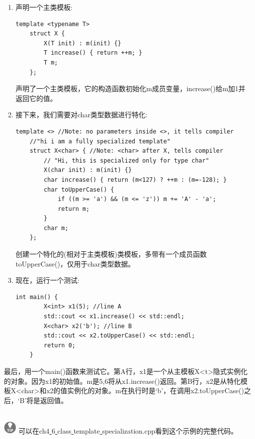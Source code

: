 \begin{enumerate}
	\item 声明一个主类模板: \par
	\begin{lstlisting}[caption={}]
	template <typename T>
	struct X {
		X(T init) : m(init) {}
		T increase() { return ++m; }
		T m;
	};
	\end{lstlisting}
	声明了一个主类模板，它的构造函数初始化m成员变量，increase()给m加1并返回它的值。 \par
	\item 接下来，我们需要对char类型数据进行特化:  \par
	\begin{lstlisting}[caption={}]
	template <> //Note: no parameters inside <>, it tells compiler
	//"hi i am a fully specialized template"
	struct X<char> { //Note: <char> after X, tells compiler
		// "Hi, this is specialized only for type char"
		X(char init) : m(init) {}
		char increase() { return (m<127) ? ++m : (m=-128); }
		char toUpperCase() {
			if ((m >= 'a') && (m <= 'z')) m += 'A' - 'a';
			return m;
		}
		char m;
	};
	\end{lstlisting}
	创建一个特化的(相对于主类模板)类模板，多带有一个成员函数toUpperCase()，仅用于char类型数据。 \par
	\item 现在，运行一个测试:   \par
	\begin{lstlisting}[caption={}]
	int main() {
		X<int> x1(5); //line A
		std::cout << x1.increase() << std::endl;
		X<char> x2('b'); //line B
		std::cout << x2.toUpperCase() << std::endl;
		return 0;
	}
	\end{lstlisting}
\end{enumerate}

最后，用一个main()函数来测试它。第A行，x1是一个从主模板X<t>隐式实例化的对象。因为x1的初始值。m是5,6将从x1.increase()返回。第B行，x2是从特化模板X<char>和x2的值实例化的对象。m在执行时是‘b’，在调用x2.toUpperCase()之后，‘B’将是返回值。 \par

\hspace*{\fill} \\ %
\includegraphics[width=0.05\textwidth]{images/tip}
可以在ch4\underline{ }6\underline{ }class\underline{ }template\underline{ }specialization.cpp看到这个示例的完整代码。 \par
\noindent\textbf{}\ \par

